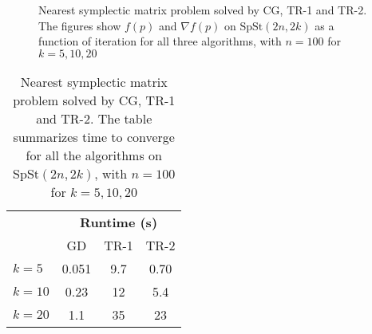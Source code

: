 \begin{figure}
    \caption[Nearest symplectic matrix problem solved by CG, TR-1 and TR-2]{Nearest symplectic matrix problem solved by CG, TR-1 and TR-2. The figures show $f(p)$ and $\nabla f(p)$ on $\mathrm{SpSt}(2n, 2k)$ as a function of iteration for all three algorithms, with $n=100$ for $k={5,10,20}$}\label{fig:nearest_symplectic_matrix_2nd_order}
\end{figure}

\begin{table}
    \centering
    \caption[Nearest symplectic matrix problem solved by CG, TR-1 and TR-2 timetable]{Nearest symplectic matrix problem solved by CG, TR-1 and TR-2. The table summarizes time to converge for all the algorithms on $\mathrm{SpSt}(2n, 2k)$, with $n=100$ for $k={5,10,20}$}\label{tab:exp1}
    \begin{tabular}{ l c c c }\label{tbl:Nearest_symplectic_matrix_2nd_order}
        & \multicolumn{3}{c}{\textbf{Runtime (s)}} \\ 
        \cmidrule(l){2-4}
        & GD & TR-1 & TR-2 \\
        \midrule
        $k=5$ & 0.051 & 9.7 & 0.70 \\
        $k=10$ & 0.23 & 12 & 5.4 \\
        $k=20$ & 1.1 & 35 & 23 \\        
    \end{tabular}
\end{table}




